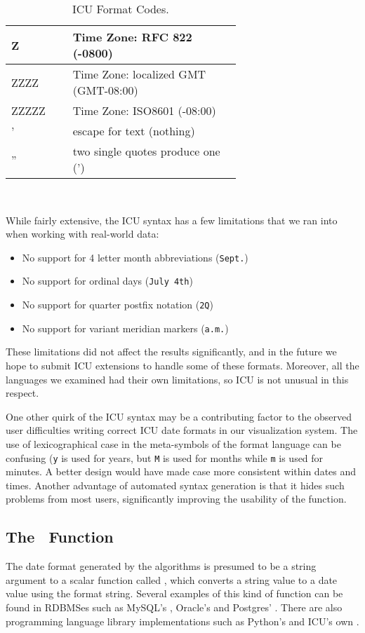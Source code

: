 \begin{table}[ht]
\begin{tabular}{|p{0.15\linewidth}| p{0.5\linewidth}|}
\scriptsize{Z} & \scriptsize{Time Zone: RFC 822 (-0800)}\\ \hline
\scriptsize{ZZZZ} & \scriptsize{Time Zone: localized GMT (GMT-08:00)}\\ \hline
\scriptsize{ZZZZZ} & \scriptsize{Time Zone: ISO8601 (-08:00)}\\ \hline
    
\scriptsize{'} & \scriptsize{escape for text (nothing)}\\ \hline
\scriptsize{''} & \scriptsize{two single quotes produce one (')}\\ \hline

\end{tabular}
\egroup
\label{tab:icuformats} \\
\caption{ICU Format Codes.}
\end{table}

While fairly extensive, the ICU syntax has a few limitations that we ran into when working with real-world data:

\begin{itemize}
\item No support for 4 letter month abbreviations (\eg \texttt{Sept.})
\item No support for ordinal days (\eg \texttt{July 4th})
\item No support for quarter postfix notation (\eg \texttt{2Q})
\item No support for variant meridian markers (\eg \texttt{a.m.})
\end{itemize}

These limitations did not affect the results significantly, and in the future we hope to submit ICU extensions to handle some of these formats. Moreover, all the languages we examined had their own limitations, so ICU is not unusual in this respect.

One other quirk of the ICU syntax may be a contributing factor to the observed user difficulties writing correct ICU date formats in our visualization system. The use of lexicographical case in the meta-symbols of the format language can be confusing (\eg \texttt{y} is used for years, but \texttt{M} is used for months while \texttt{m} is used for minutes. A better design would have made case more consistent within dates and times. Another advantage of automated syntax generation is that it hides such problems from most users, significantly improving the usability of the function.

\subsection{The \dateparse\ Function}

The date format generated by the algorithms is presumed to be a string argument to a scalar function called \dateparse, which converts a string value to a date value using the format string. Several examples of this kind of function can be found in RDBMSes such as MySQL's , Oracle's  and Postgres' . There are also programming language library implementations such as Python's  and ICU's own .
